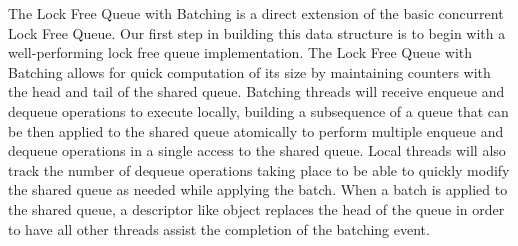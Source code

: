 The Lock Free Queue with Batching is a direct extension of the basic concurrent Lock Free Queue. Our first step in building this data structure is to begin with a well-performing lock free queue implementation. The Lock Free Queue with Batching allows for quick computation of its size by maintaining counters with the head and tail of the shared queue. Batching threads will receive enqueue and dequeue operations to execute locally, building a subsequence of a queue that can be then applied to the shared queue atomically to perform multiple enqueue and dequeue operations in a single access to the shared queue. Local threads will also track the number of dequeue operations taking place to be able to quickly modify the shared queue as needed while applying the batch. When a batch is applied to the shared queue, a descriptor like object replaces the head of the queue in order to have all other threads assist the completion of the batching event. 